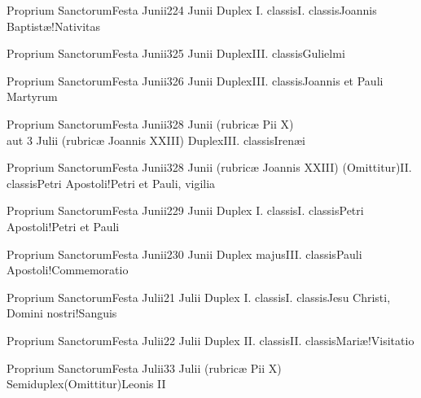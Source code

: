 \documentclass[psalterium-feriale.tex]{subfiles}
\begin{document}
	{Proprium Sanctorum}{Festa Junii}{2}{24 Junii}
	{Duplex I. classis}{I. classis}{Joannis Baptistæ!Nativitas}
	{}
	{}
\psalmodiapropria
{}

	{Proprium Sanctorum}{Festa Junii}{3}{25 Junii}
	{Duplex}{III. classis}{Gulielmi}
	{}
	{}

	{Proprium Sanctorum}{Festa Junii}{3}{26 Junii}
	{Duplex}{III. classis}{Joannis et Pauli Martyrum}
	{}
	{}

	{Proprium Sanctorum}{Festa Junii}{3}{28 Junii (rubricæ Pii X)\\aut 3 Julii (rubricæ Joannis XXIII)}
	{Duplex}{III. classis}{Irenæi}
	{}
	{}

	{Proprium Sanctorum}{Festa Junii}{3}{28 Junii (rubricæ Joannis XXIII)}
	{(Omittitur)}{II. classis}{Petri Apostoli!Petri et Pauli, vigilia}
	{}
	{}
\invitferia

	{Proprium Sanctorum}{Festa Junii}{2}{29 Junii}
	{Duplex I. classis}{I. classis}{Petri Apostoli!Petri et Pauli}
	{}
	{}
\psalmodiapropria


	{Proprium Sanctorum}{Festa Junii}{2}{30 Junii}
	{Duplex majus}{III. classis}{Pauli Apostoli!Commemoratio}
	{}
	{}
\psalmodiapropria

	{Proprium Sanctorum}{Festa Julii}{2}{1 Julii}
	{Duplex I. classis}{I. classis}{Jesu Christi, Domini nostri!Sanguis}
	{}
	{}
\psalmodiapropria

	{Proprium Sanctorum}{Festa Julii}{2}{2 Julii}
	{Duplex II. classis}{II. classis}{Mariæ!Visitatio}
	{}
	{}
\psalmodiapropria

	{Proprium Sanctorum}{Festa Julii}{3}{3 Julii (rubricæ Pii X)}
	{Semiduplex}{(Omittitur)}{Leonis II}
	{}
	{}
\end{document}
